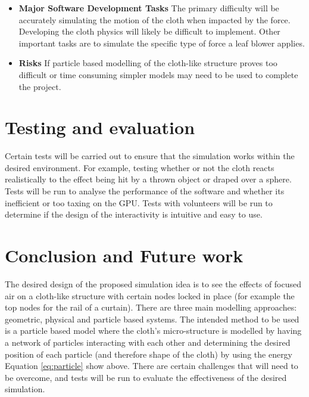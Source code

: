 \documentclass[conference,backref=page]{acmsiggraph}
\begin{document}
\begin{itemize}
\item  {\bf Major Software Development Tasks} The primary difficulty will be accurately simulating the motion of the cloth when impacted by the force. Developing the cloth physics will likely be difficult to implement. Other important tasks are to simulate the specific type of force a leaf blower applies.
\item {\bf Risks} If particle based modelling of the cloth-like structure proves too difficult or time consuming simpler models may need to be used to complete the project.
\end{itemize}

\section{Testing and evaluation}
Certain tests will be carried out to ensure that the simulation works within the desired environment. For example, testing whether or not the cloth reacts realistically to the effect being hit by a thrown object or draped over a sphere. Tests will be run to analyse the performance of the software and whether its inefficient or too taxing on the GPU. Tests with volunteers will be run to determine if the design of the interactivity is intuitive and easy to use.


\section{Conclusion and Future work}
The desired design of the proposed simulation idea is to see the effects of focused air on a cloth-like structure with certain nodes locked in place (for example the top nodes for the rail of a curtain). There are three main modelling approaches: geometric, physical and particle based systems. The intended method to be used is a particle based model where the cloth's micro-structure is modelled by having a network of particles interacting with each other and determining the desired position of each particle (and therefore shape of the cloth) by using the energy Equation \ref{eq:particle} show above. There are certain challenges that will need to be overcome, and tests will be run to evaluate the effectiveness of the desired simulation.






\end{document}
